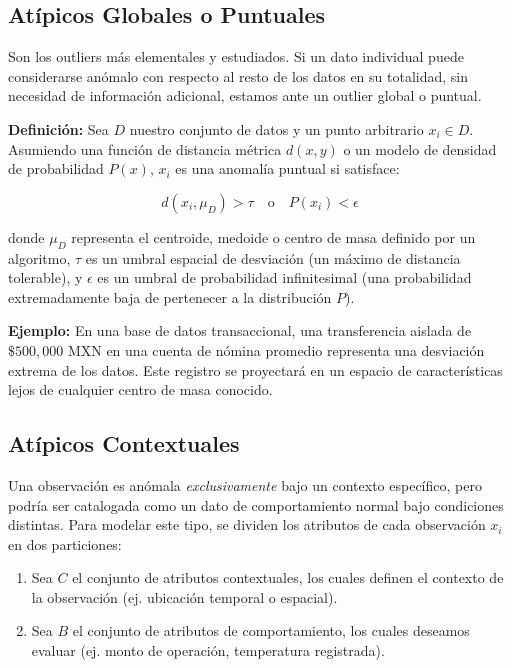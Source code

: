 \subsection{Atípicos Globales o Puntuales}

Son los outliers más elementales y estudiados. Si un dato individual puede considerarse anómalo con respecto al resto de los datos en su totalidad, sin necesidad de información adicional, estamos ante un outlier global o puntual.

\textbf{Definición:} Sea $D$ nuestro conjunto de datos y un punto arbitrario $x_i \in D$. Asumiendo una función de distancia métrica $d(x, y)$ o un modelo de densidad de probabilidad $P(x)$, $x_i$ es una anomalía puntual si satisface:

\[
d(x_i, \mu_D) > \tau
\quad \text{o} \quad
P(x_i) < \epsilon
\]

donde $\mu_D$ representa el centroide, medoide o centro de masa definido por un algoritmo, $\tau$ es un umbral espacial de desviación (un máximo de distancia tolerable), y $\epsilon$ es un umbral de probabilidad infinitesimal (una probabilidad extremadamente baja de pertenecer a la distribución $P$).

\textbf{Ejemplo:} En una base de datos transaccional, una transferencia aislada de $\$500{,}000$ MXN en una cuenta de nómina promedio representa una desviación extrema de los datos. Este registro se proyectará en un espacio de características lejos de cualquier centro de masa conocido.

\subsection{Atípicos Contextuales}

Una observación es anómala \textit{exclusivamente} bajo un contexto específico, pero podría ser catalogada como un dato de comportamiento normal bajo condiciones distintas. Para modelar este tipo, se dividen los atributos de cada observación $x_i$ en dos particiones:

\begin{enumerate}
	\item Sea $C$ el conjunto de atributos contextuales, los cuales definen el contexto de la observación (ej. ubicación temporal o espacial).
	
	\item Sea $B$ el conjunto de atributos de comportamiento, los cuales deseamos evaluar (ej. monto de operación, temperatura registrada).
\end{enumerate}


